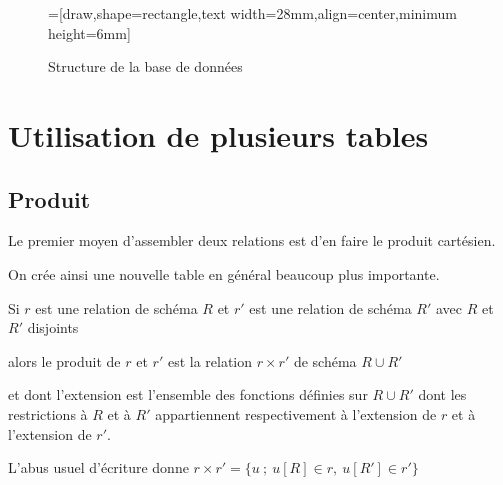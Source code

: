 \begin{figure}[h]
\begin{center}
=[draw,shape=rectangle,text width=28mm,align=center,minimum height=6mm]
\caption{Structure de la base de données}
\end{center}
\end{figure}
\newpage
\section{Utilisation de plusieurs tables}
\subsection{Produit}
Le premier moyen d'assembler deux relations est d'en faire le produit cartésien. 

On crée ainsi une nouvelle table en général beaucoup plus importante.
\begin{defin}

Si $r$ est une relation de schéma $R$ et $r'$ est une relation de schéma $R'$ avec $R$ et $R'$ disjoints

alors le produit de $r$ et $r'$ est la relation $r\times r'$ de schéma $R\cup R'$ 

et dont l'extension est l'ensemble des fonctions définies sur $R\cup R'$ dont les restrictions à $R$ et à $R'$ appartiennent respectivement à l'extension de $r$ et à l'extension de $r'$.

L'abus usuel d'écriture donne
$r\times r'=\bigl\{u\ ;\ u[R]\in r,\ u[R']\in r'\bigr\}$
\end{defin}

